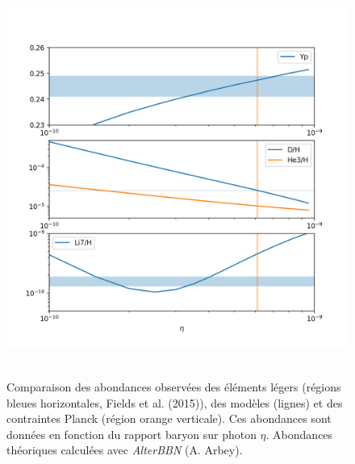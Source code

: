 \begin{figure}[htbp]
	\centering
		\includegraphics[height=13cm]{figs/BBN.png}
		\caption[Comparaison des abondances observées des éléments légers]{Comparaison des abondances observées des éléments légers (régions bleues horizontales, Fields et al. (2015)), des modèles (lignes) et des contraintes Planck (région orange verticale). Ces abondances sont données en fonction du rapport baryon sur photon  $\eta$. Abondances théoriques calculées avec \textit{AlterBBN} (A. Arbey).}
	\label{f:nucle}
\end{figure}
